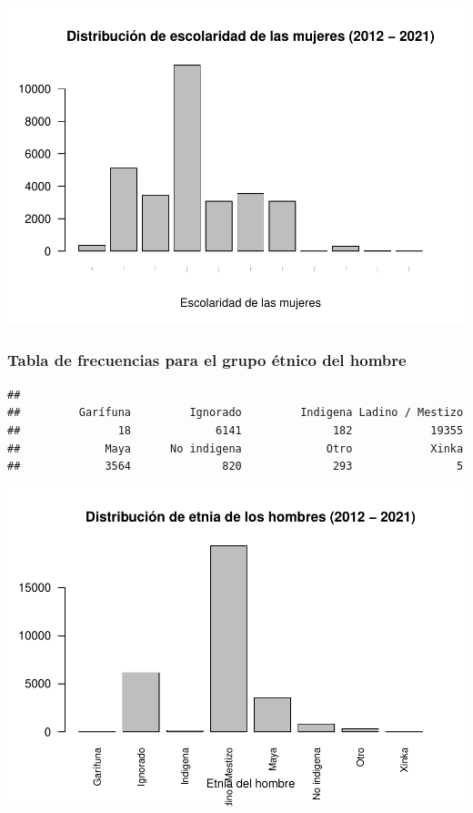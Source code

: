 \documentclass[
]{article}
\begin{document}
\includegraphics{Proyecto_files/figure-latex/frecuenciaEscolaridadMujer-1.pdf}

\hypertarget{tabla-de-frecuencias-para-el-grupo-uxe9tnico-del-hombre}{%
\subsubsection{Tabla de frecuencias para el grupo étnico del
hombre}\label{tabla-de-frecuencias-para-el-grupo-uxe9tnico-del-hombre}}

\begin{verbatim}
## 
##         Garífuna         Ignorado         Indigena Ladino / Mestizo 
##               18             6141              182            19355 
##             Maya      No indigena             Otro            Xinka 
##             3564              820              293                5
\end{verbatim}

\includegraphics{Proyecto_files/figure-latex/frecuenciaEtniaHombre-1.pdf}
\end{document}
